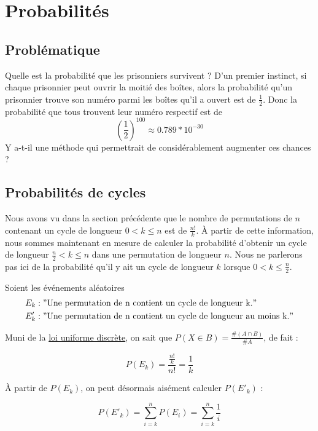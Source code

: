 \section{Probabilités}
\subsection{Problématique}

	Quelle est la probabilité que les prisonniers survivent ?
	D'un premier instinct, si chaque prisonnier peut ouvrir la moitié des boîtes, alors la probabilité qu'un prisonnier
	trouve son numéro parmi les boîtes qu'il a ouvert est de $\frac{1}{2}$. Donc la probabilité que tous trouvent leur
	numéro respectif est de $$\left(\frac{1}{2}\right)^{100} \approx 0.789 * 10^{-30}$$
	Y a-t-il une méthode qui permettrait de considérablement augmenter ces chances ?

\subsection{Probabilités de cycles}

	Nous avons vu dans la section précédente que le nombre de permutations de $n$ contenant un cycle de longueur $0 < k \leq n$ est de $\frac{n!}{k}$.
	À partir de cette information, nous sommes maintenant en mesure de calculer la probabilité d'obtenir un cycle de longueur $\frac{n}{2} < k \leq n$ dans une permutation de longueur $n$.
	Nous ne parlerons pas ici de la probabilité qu'il y ait un cycle de longueur $k$ lorsque $0 < k \leq \frac{n}{2}$.

	Soient les événements aléatoires
	\begin{align*}
		E_k  & : "\text{Une permutation de n contient un cycle de longueur k.}"          \\
		E'_k & : "\text{Une permutation de n contient un cycle de longueur au moins k.}"
	\end{align*}

	Muni de la \href{https://fr.wikipedia.org/wiki/Loi_uniforme_discr%C3%A8te#Calcul_d'une_probabilit%C3%A9}{loi uniforme discrète}, on sait que $P(X \in B) = \frac{\#(A \cap B)}{\#A}$, de fait :

	\begin{equation}
		P(E_k) = \frac{\frac{n!}{k}}{n!} = \frac{1}{k}
	\end{equation}

	À partir de $P(E_k)$, on peut désormais aisément calculer $P(E'_k)$ :

	\begin{equation}
		P(E'_k) = \sum_{i = k}^{n} P(E_i) = \sum_{i = k}^{n} \frac{1}{i}
	\end{equation}

